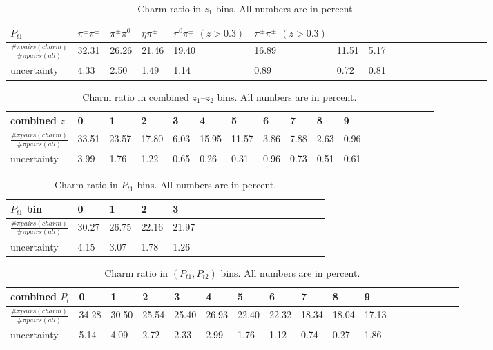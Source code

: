 \begin{table}[H]\footnotesize
\centering
\begin{tabular}{|l|l|l|l|l|l|l|l|l|l|l|l|l|l|l|l|l|l|}
\hline
$P_{t1}$ & $\pi^{\pm}\pi^{\pm}$ & $\pi^{\pm}\pi^0$ & $\eta\pi^{\pm}$ & $\pi^0\pi^{\pm}$ $(z>0.3)$ & $\pi^{\pm}\pi^{\pm}$ $(z>0.3)$ \\ \hline
$\frac{\# \pi pairs(charm)}{\# \pi pairs(all)}$ & 32.31 & 26.26 & 21.46 & 19.40 & 16.89 & 11.51 & 5.17 \\ \hline
uncertainty & 4.33 & 2.50 & 1.49 & 1.14 & 0.89 & 0.72 & 0.81 \\ \hline
\end{tabular}
\caption[Charm ratio in $z_1$ bins]{Charm ratio in $z_1$ bins. All numbers are in percent.}
\label{tab:sinzcharmratio}
\end{table}

\begin{table}[H]\footnotesize
\centering
\begin{tabular}{|l|l|l|l|l|l|l|l|l|l|l|l|l|l|l|l|l|l|}
\hline
combined $z$ & 0 & 1 & 2 & 3 & 4 & 5 & 6 & 7 & 8 & 9 \\ \hline
$\frac{\# \pi pairs(charm)}{\# \pi pairs(all)}$ & 33.51 & 23.57 & 17.80 & 6.03 & 15.95 & 11.57 & 3.86 & 7.88 & 2.63 & 0.96\\ \hline
uncertainty & 3.99 & 1.76 & 1.22 & 0.65 & 0.26 & 0.31 & 0.96 & 0.73 & 0.51 & 0.61 \\ \hline
\end{tabular}
\caption[Charm ratio in combined $z_{1}$--$z_{2}$ bins]{Charm ratio in combined $z_{1}$--$z_{2}$ bins. All numbers are in percent.}
\label{tab:comzcharmratio}
\end{table}

\begin{table}[H]\footnotesize
\centering
\begin{tabular}{|l|l|l|l|l|l|l|l|l|l|l|l|l|l|l|l|l|l|}
\hline
$P_{t1}$ bin & 0 & 1 & 2 & 3 \\ \hline
$\frac{\# \pi pairs(charm)}{\# \pi pairs(all)}$  & 30.27 & 26.75 & 22.16 & 21.97 \\ \hline
uncertainty &   4.15 & 3.07 & 1.78 & 1.26 \\ \hline
\end{tabular}
\caption[Charm ratio in $P_{t1}$ bins]{Charm ratio in $P_{t1}$ bins. All numbers are in percent.}
\label{tab:sinptcharmratio}
\end{table}

\begin{table}[H]\footnotesize
\centering
\begin{tabular}{|l|l|l|l|l|l|l|l|l|l|l|l|l|l|l|l|l|l|}
\hline
combined $P_t$ & 0 & 1 & 2 & 3 & 4 & 5 & 6 & 7 & 8 & 9 \\ \hline
$\frac{\# \pi pairs(charm)}{\# \pi pairs(all)}$ & 34.28 & 30.50 & 25.54 & 25.40 & 26.93 & 22.40 & 22.32 & 18.34 & 18.04 & 17.13 \\ \hline
uncertainty & 5.14 & 4.09 & 2.72 & 2.33 & 2.99 & 1.76 & 1.12 & 0.74 & 0.27 & 1.86  \\ \hline
\end{tabular}
\caption[Charm ratio in $(P_{t1},P_{t2})$ bin]{Charm ratio in $(P_{t1},P_{t2})$ bins. All numbers are in percent.}
\label{tab:comptcharmratio}
\end{table}
\fi
